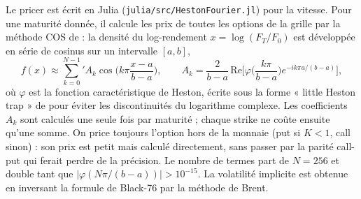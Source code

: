 Le pricer est écrit en Julia (\texttt{julia/src/HestonFourier.jl}) pour la vitesse. Pour une maturité donnée, il
calcule les prix de toutes les options de la grille par la méthode COS de \citet{fang2008} : la densité du
log-rendement $x = \log(F_T/F_0)$ est développée en série de cosinus sur un intervalle $[a,b]$,
\begin{equation}
  f(x) \approx {\sum_{k=0}^{N-1}}' A_k \cos\!\Big(k\pi\frac{x-a}{b-a}\Big), \qquad
  A_k = \frac{2}{b-a}\, \mathrm{Re}\Big[\varphi\Big(\frac{k\pi}{b-a}\Big) e^{-ik\pi a/(b-a)}\Big],
\end{equation}
où $\varphi$ est la fonction caractéristique de Heston, écrite sous la forme « little Heston trap » de
\citet{albrecher2007} pour éviter les discontinuités du logarithme complexe. Les coefficients $A_k$ sont calculés
une seule fois par maturité ; chaque strike ne coûte ensuite qu'une somme. On price toujours l'option hors de la
monnaie (put si $K<1$, call sinon) : son prix est petit mais calculé directement, sans passer par la parité
call-put qui ferait perdre de la précision. Le nombre de termes part de $N = 256$ et double tant que
$|\varphi(N\pi/(b-a))| > 10^{-15}$. La volatilité implicite est obtenue en inversant la formule de Black-76 par la
méthode de Brent.

